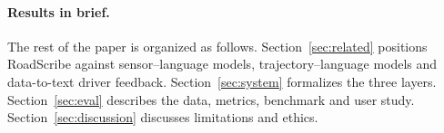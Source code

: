 \paragraph{Results in brief.}

The rest of the paper is organized as follows.
Section~\ref{sec:related} positions RoadScribe against sensor--language models, trajectory--language models and data-to-text driver feedback.
Section~\ref{sec:system} formalizes the three layers.
Section~\ref{sec:eval} describes the data, metrics, benchmark and user study.
Section~\ref{sec:discussion} discusses limitations and ethics.
